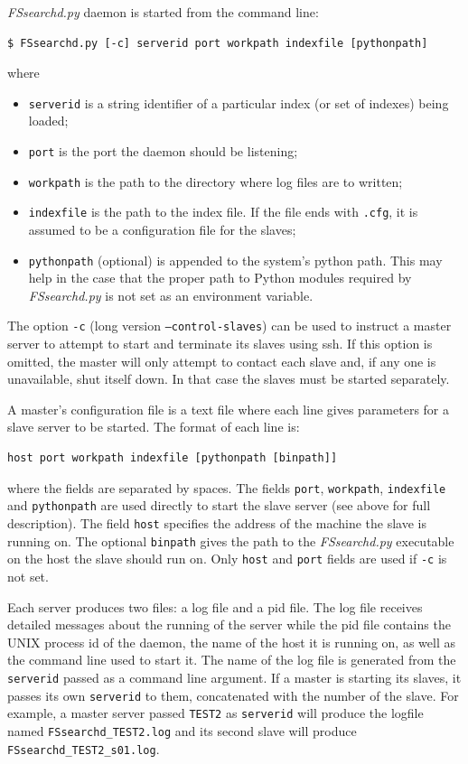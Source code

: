 \documentclass[10pt,letter]{article}
\begin{document}
\textit{FSsearchd.py} daemon is started from the command line:
\begin{verbatim}
$ FSsearchd.py [-c] serverid port workpath indexfile [pythonpath]
\end{verbatim}
where
\begin{itemize}
\item \texttt{serverid} is a string identifier of a particular index (or set of indexes) being loaded;
\item \texttt{port} is the port the daemon should be listening;
\item \texttt{workpath} is the path to the directory where log files are to written;
\item \texttt{indexfile} is the path to the index file. If the file ends with \texttt{.cfg}, it is assumed to be a configuration file for the slaves;
\item \texttt{pythonpath} (optional) is appended to the system's python path. This may help in the case that the proper path to Python modules required by \textit{FSsearchd.py} is not set as an environment variable.
\end{itemize}

The option \texttt{-c} (long version \texttt{--control-slaves}) can be used to instruct a master server to attempt to start and terminate its slaves using ssh. If this option is omitted, the master will only attempt to contact each slave and, if any one is unavailable, shut itself down. In that case the slaves must be started separately.

A master's configuration file is a text file where each line gives parameters for a slave server to be started. The format of each line is:
\begin{verbatim}
host port workpath indexfile [pythonpath [binpath]]
\end{verbatim}
where the fields are separated by spaces. The fields \texttt{port}, \texttt{workpath}, \texttt{indexfile} and \texttt{pythonpath} are used directly to start the slave server (see above for full description). The field \texttt{host} specifies the address of the machine the slave is running on. The optional \texttt{binpath} gives the path to the \textit{FSsearchd.py} executable on the host the slave should run on. Only \texttt{host} and \texttt{port} fields are used if \texttt{-c} is not set.

Each server produces two files: a log file and a pid file. The log file receives detailed messages about the running of the server while the pid file contains the UNIX process id of the daemon, the name of the host it is running on, as well as the command line used to start it. The name of the log file is generated from the \texttt{serverid} passed as a command line argument. If a master is starting its slaves, it passes its own \texttt{serverid} to them, concatenated with the number of the slave. For example, a master server passed \texttt{TEST2} as \texttt{serverid} will produce the logfile named \texttt{FSsearchd\_TEST2.log} and its second slave will produce \texttt{FSsearchd\_TEST2\_s01.log}.
\end{document}
